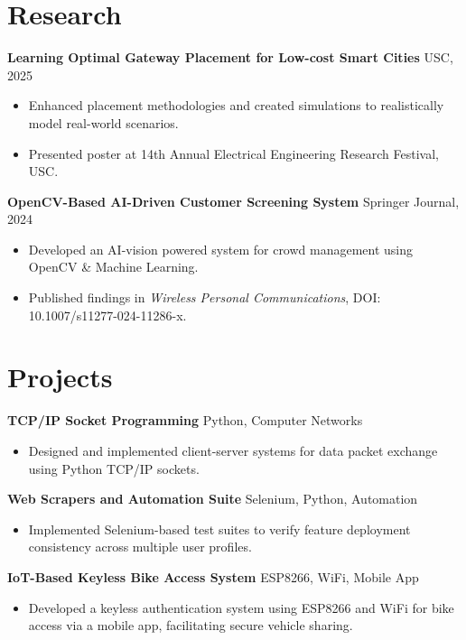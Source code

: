 \documentclass[letterpaper,10pt]{article}
\begin{document}
\section*{Research}
    \textbf{Learning Optimal Gateway Placement for Low-cost Smart Cities} \hfill USC, 2025
    \begin{itemize}[leftmargin=*]
        \item Enhanced placement methodologies and created simulations to realistically model real-world scenarios.
        \item Presented poster at 14th Annual Electrical Engineering Research Festival, USC.
    \end{itemize}
    
    \textbf{OpenCV-Based AI-Driven Customer Screening System} \hfill Springer Journal, 2024
    \begin{itemize}[leftmargin=*]
        \item Developed an AI-vision powered system for crowd management using OpenCV \& Machine Learning.
        \item Published findings in \textit{Wireless Personal Communications}, DOI: 10.1007/s11277-024-11286-x.
    \end{itemize}

\section*{Projects}
    \textbf{TCP/IP Socket Programming} \hfill Python, Computer Networks
    \begin{itemize}[leftmargin=*]
        \item Designed and implemented client-server systems for data packet exchange using Python TCP/IP sockets.
    \end{itemize}

    \textbf{Web Scrapers and Automation Suite} \hfill Selenium, Python, Automation
    \begin{itemize}[leftmargin=*]
        \item Implemented Selenium-based test suites to verify feature deployment consistency across multiple user profiles.
    \end{itemize}
    
    \textbf{IoT-Based Keyless Bike Access System} \hfill ESP8266, WiFi, Mobile App
    \begin{itemize}[leftmargin=*]
        \item Developed a keyless authentication system using ESP8266 and WiFi for bike access via a mobile app, facilitating secure vehicle sharing.
    \end{itemize}
\end{document}
